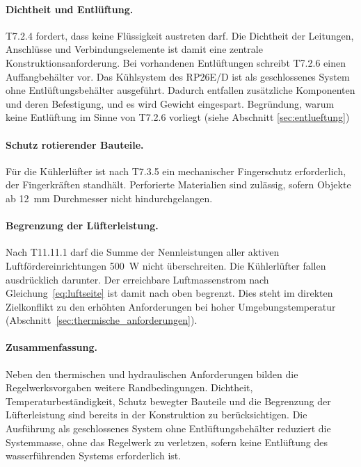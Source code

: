 \paragraph{Dichtheit und Entlüftung.}
T7.2.4 fordert, dass keine Flüssigkeit austreten darf. Die Dichtheit der
Leitungen, Anschlüsse und Verbindungselemente ist damit eine zentrale
Konstruktionsanforderung. Bei vorhandenen Entlüftungen schreibt T7.2.6 einen
Auffangbehälter vor. Das Kühlsystem des RP26E/D ist als geschlossenes System
ohne Entlüftungsbehälter ausgeführt. Dadurch entfallen zusätzliche Komponenten
und deren Befestigung, und es wird Gewicht eingespart. Begründung, warum
keine Entlüftung im Sinne von T7.2.6 vorliegt (siehe Abschnitt
\ref{sec:entlueftung})

\paragraph{Schutz rotierender Bauteile.}
Für die Kühlerlüfter ist nach T7.3.5 ein mechanischer Fingerschutz erforderlich,
der Fingerkräften standhält. Perforierte Materialien sind zulässig, sofern
Objekte ab \SI{12}{\milli\meter} Durchmesser nicht hindurchgelangen.

\paragraph{Begrenzung der Lüfterleistung.}
Nach T11.11.1 darf die Summe der Nennleistungen aller aktiven Luftfördereinrichtungen
\SI{500}{\watt} nicht überschreiten. Die Kühlerlüfter fallen ausdrücklich
darunter. Der erreichbare Luftmassenstrom nach Gleichung~\eqref{eq:luftseite}
ist damit nach oben begrenzt. Dies steht im direkten Zielkonflikt zu den
erhöhten Anforderungen bei hoher Umgebungstemperatur
(Abschnitt~\ref{sec:thermische_anforderungen}).

\paragraph{Zusammenfassung.}
Neben den thermischen und hydraulischen Anforderungen bilden die
Regelwerksvorgaben weitere Randbedingungen. Dichtheit, Temperaturbeständigkeit,
Schutz bewegter Bauteile und die Begrenzung der Lüfterleistung sind bereits
in der Konstruktion zu berücksichtigen. Die Ausführung als geschlossenes System
ohne Entlüftungsbehälter reduziert die Systemmasse, ohne das Regelwerk zu
verletzen, sofern keine Entlüftung des wasserführenden Systems erforderlich ist.


